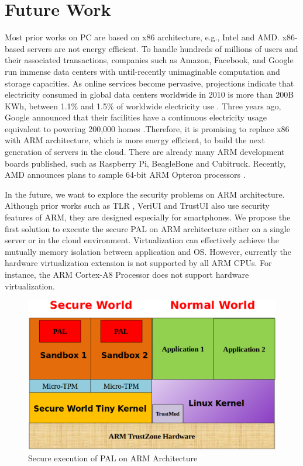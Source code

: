 \section{Future Work}
\label{sec:future}

Most prior works on PC are based on x86 architecture, e.g., Intel and AMD.
x86-based servers are not energy efficient. To handle hundreds of millions of
users and their associated transactions, companies such as Amazon, Facebook,
and Google run immense data centers with until-recently unimaginable
computation and storage capacities. As online services become pervasive,
projections indicate that electricity consumed in global data centers worldwide
in 2010 is more than 200B KWh, between 1.1\% and 1.5\% of worldwide electricity
use \cite{times}. Three years ago, Google announced that their facilities have
a continuous electricity usage equivalent to powering 200,000 homes
\cite{nytimes-google}.Therefore, it is promising to replace x86 with ARM
architecture, which is more energy efficient, to build the next generation of
servers in the cloud. There are already many ARM development boards published,
such as Raspberry Pi, BeagleBone and Cubitruck. Recently, AMD announces plans
to sample 64-bit ARM Opteron processors \cite{amdarm}. 

In the future, we want to explore the security problems on ARM architecture.
Although prior works such as TLR \cite{TLR}, VeriUI \cite{VeriUI} and TrustUI
\cite{TrustUI} also use security features of ARM, they are designed especially
for smartphones. We propose the first solution to execute the secure PAL on ARM
architecture either on a single server or in the cloud environment.
Virtualization can effectively achieve the mutually memory isolation between
application and OS. However, currently the hardware virtualization extension is
not supported by all ARM CPUs. For instance, the ARM Cortex-A8 Processor does
not support hardware virtualization.

\begin{figure}[htb]
\centering
\includegraphics[width=\columnwidth]{figures/future.eps}
\caption{Secure execution of PAL on ARM Architecture}
\label{fig:future}
\end{figure}

